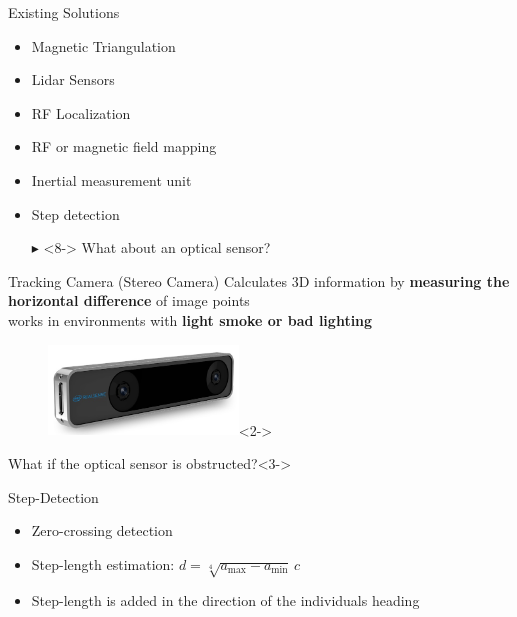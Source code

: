 \documentclass[aspectratio=169]{beamer}
\begin{document}
{	\begin{frame}{Existing Solutions}
		\begin{itemize}
			\item<2-> Magnetic Triangulation %
			\item<3-> Lidar Sensors %
			\item<4-> RF Localization 
			\item<5-> RF or magnetic field mapping%
			\item<6-> Inertial measurement unit %
			\item<7-> Step detection %
			\item[$\blacktriangleright$]<8-> What about an optical sensor?
		\end{itemize}
	\end{frame}
	
	
	\begin{frame}{Tracking Camera (Stereo Camera)}
		 Calculates 3D information by \textbf{measuring the horizontal difference} of image points\\
		 works in environments with \textbf{light smoke or bad lighting}
	
		
		
		\begin{figure}
			\centering
			\includegraphics[width=0.45\textwidth]{realsense.jpg}<2->
		\end{figure}
		
			\begin{block}{What if the optical sensor is obstructed?}<3->
		\end{block}
	\end{frame}
	
	
	\begin{frame}{Step-Detection}
		\begin{itemize}
			\item<2-> Zero-crossing detection 
			\item<3-> Step-length estimation: $d = \sqrt[4]{a_{\max}-a_{\min}}  \, c$
			\item<4-> Step-length is added in the direction of the individuals heading
		\end{itemize}
		

\end{frame}}
\end{document}
